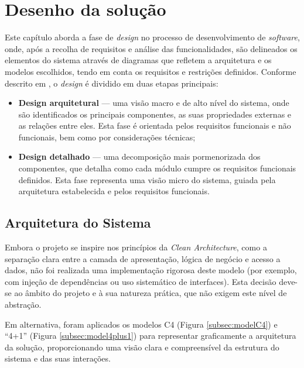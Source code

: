 
\chapter{Desenho da solução}

Este capítulo aborda a fase de \textit{design} no processo de desenvolvimento de \textit{software}, onde, após a recolha de requisitos e análise das funcionalidades, são delineados os elementos do sistema através de diagramas que refletem a arquitetura e os modelos escolhidos, tendo em conta os requisitos e restrições definidos. Conforme descrito em \cite{tsui2022essentials}, o \textit{design} é dividido em duas etapas principais:

\begin{itemize}
    \item \textbf{Design arquitetural} — uma visão macro e de alto nível do sistema, onde são identificados os principais componentes, as suas propriedades externas e as relações entre eles. Esta fase é orientada pelos requisitos funcionais e não funcionais, bem como por considerações técnicas;
    \item \textbf{Design detalhado} — uma decomposição mais pormenorizada dos componentes, que detalha como cada módulo cumpre os requisitos funcionais definidos. Esta fase representa uma visão micro do sistema, guiada pela arquitetura estabelecida e pelos requisitos funcionais.
\end{itemize}



\section{Arquitetura do Sistema} 

Embora o projeto se inspire nos princípios da \textit{Clean Architecture}, como a separação clara entre a camada de apresentação, lógica de negócio e acesso a dados, não foi realizada uma implementação rigorosa deste modelo (por exemplo, com injeção de dependências ou uso sistemático de interfaces). Esta decisão deve-se ao âmbito do projeto e à sua natureza prática, que não exigem este nível de abstração.

Em alternativa, foram aplicados os modelos C4 (Figura \ref{subsec:modelC4}) e “4+1” (Figura \ref{subsec:model4plus1}) para representar graficamente a arquitetura da solução, proporcionando uma visão clara e compreensível da estrutura do sistema e das suas interações.


